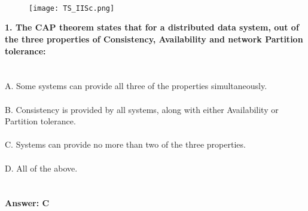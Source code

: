 \documentclass[prl,twocolumn,showpacs,preprintnumbers,superscriptaddress]{revtex4}
\theoremstyle{plain}
\theoremstyle{definition}
\begin{document}
\begin{widetext}
\\
\\
\\

\begin{wrapfigure}
\centering
\end{wrapfigure}
\begin{figure}[h!]
 \begin{right}
  \hfill\texttt{[image: TS\_IISc.png]}
 \end{right}
\end{figure}
\noindent\textbf{1. The CAP theorem states that for a distributed data system, out of the three properties of Consistency, Availability and network Partition tolerance:}
\\
\\
\\
A. Some systems can provide all three of the properties simultaneously.
\\
\\
B. Consistency is provided by all systems, along with either Availability or Partition tolerance.
\\
\\
C. Systems can provide no more than two of the three properties.
\\
\\
D. All of the above.
\\
\\
\\
\textbf{Answer: C}
\\
\\
\\
\\

\end{widetext}
\end{document}
